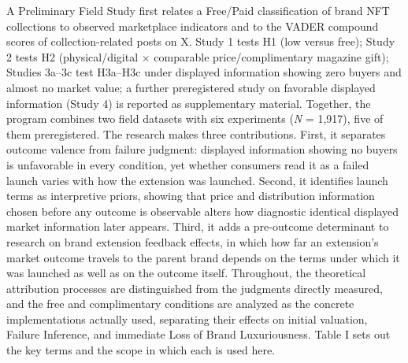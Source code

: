 \documentclass[12pt, a4paper]{article}
\begin{document}
A Preliminary Field Study first relates a Free/Paid classification of brand NFT collections to observed marketplace indicators and to the VADER compound scores of collection-related posts on X. Study 1 tests H1 (low versus free); Study 2 tests H2 (physical/digital $\times$ comparable price/complimentary magazine gift); Studies 3a--3c test H3a--H3c under displayed information showing zero buyers and almost no market value; a further preregistered study on favorable displayed information (Study 4) is reported as supplementary material. Together, the program combines two field datasets with six experiments (\emph{N} = 1,917), five of them preregistered. The research makes three contributions. First, it separates outcome valence from failure judgment: displayed information showing no buyers is unfavorable in every condition, yet whether consumers read it as a failed launch varies with how the extension was launched. Second, it identifies launch terms as interpretive priors, showing that price and distribution information chosen before any outcome is observable alters how diagnostic identical displayed market information later appears. Third, it adds a pre-outcome determinant to research on brand extension feedback effects, in which how far an extension's market outcome travels to the parent brand depends on the terms under which it was launched as well as on the outcome itself. Throughout, the theoretical attribution processes are distinguished from the judgments directly measured, and the free and complimentary conditions are analyzed as the concrete implementations actually used, separating their effects on initial valuation, Failure Inference, and immediate Loss of Brand Luxuriousness. Table I sets out the key terms and the scope in which each is used here.
\end{document}
